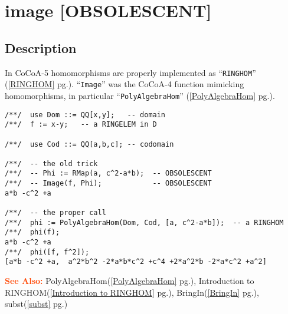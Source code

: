 \documentclass[a4paper]{mybook}
\newenvironment{command}{}{} %
\newcommand\SeeAlso{\par\textcolor{OrangeRed}{\textbf{\large See Also: }}}
\begin{document}
\section{image [OBSOLESCENT]}
\label{image [OBSOLESCENT]}
\begin{command} %



\subsection*{Description}

In CoCoA-5 homomorphisms are properly implemented as ``\verb&RINGHOM&'' (\ref{RINGHOM} pg.\pageref{RINGHOM}).
``\verb&Image&'' was the CoCoA-4 function mimicking homomorphisms, in
particular ``\verb&PolyAlgebraHom&'' (\ref{PolyAlgebraHom} pg.\pageref{PolyAlgebraHom}).
\begin{Verbatim}[label=example, rulecolor=\color{PineGreen}, frame=single]
/**/  use Dom ::= QQ[x,y];   -- domain
/**/  f := x-y;   -- a RINGELEM in D

/**/  use Cod ::= QQ[a,b,c]; -- codomain

/**/  -- the old trick
/**/  -- Phi := RMap(a, c^2-a*b);  -- OBSOLESCENT
/**/  -- Image(f, Phi);            -- OBSOLESCENT
a*b -c^2 +a

/**/  -- the proper call
/**/  phi := PolyAlgebraHom(Dom, Cod, [a, c^2-a*b]);  -- a RINGHOM
/**/  phi(f);
a*b -c^2 +a
/**/  phi([f, f^2]);
[a*b -c^2 +a,  a^2*b^2 -2*a*b*c^2 +c^4 +2*a^2*b -2*a*c^2 +a^2]
\end{Verbatim}


\SeeAlso %
  PolyAlgebraHom(\ref{PolyAlgebraHom} pg.\pageref{PolyAlgebraHom}), 
    Introduction to RINGHOM(\ref{Introduction to RINGHOM} pg.\pageref{Introduction to RINGHOM}), 
    BringIn(\ref{BringIn} pg.\pageref{BringIn}), 
    subst(\ref{subst} pg.\pageref{subst})
\end{command} %
\end{document}
